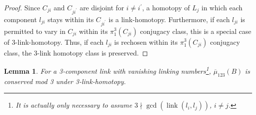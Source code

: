 \documentclass[12pt]{amsart}
\newcommand{\pr}{\prime}
\newcommand{\lbar}[1]{\overline{#1}}
\newtheorem{lemma}[thm]{Lemma}
\theoremstyle{definition}
\theoremstyle{remark}
\begin{document}
\begin{proof}
	Since $C_{ji}$ and $C_{ji^\pr}$ are disjoint for $i \neq i^\pr$, a homotopy of $L_j$ in which each component $l_{ji}$ stays within its $C_{ji^\pr}$ is a link-homotopy. Furthermore, if each $l_{ji}$ is permitted to vary in $C_{ji}$ within its $\pi_1^3(C_{ji})$ conjugacy class, this is a special case of 3-link-homotopy. Thus, if each $l_{ji}$ is rechosen within its $\pi_1^3(C_{ji})$ conjugacy class, the 3-link homotopy class is preserved.
\end{proof}

\begin{lemma}\label{lm:vanishing-ln}
	For a 3-component link with vanishing linking numbers\footnote{It is actually only necessary to assume $3 \nmid \operatorname{gcd}(\operatorname{link}(l_i,l_j))$, $i \neq j$.}, $\lbar{\mu}_{123}(B)$ is conserved mod 3 under 3-link-homotopy.
\end{lemma}
\end{document}
